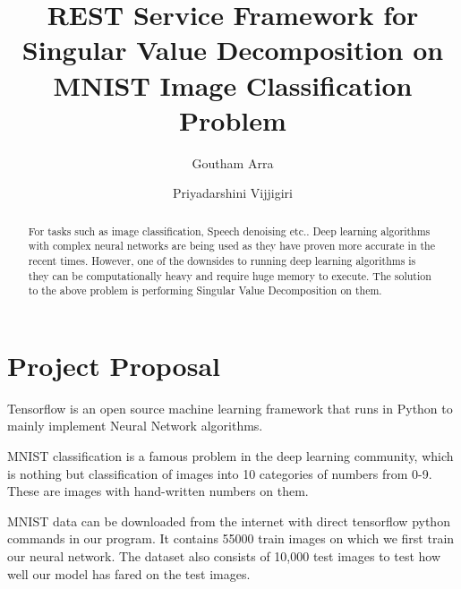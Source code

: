 
\title{REST Service Framework for Singular Value  Decomposition on MNIST Image Classification Problem}

\author{Goutham Arra}

\author{Priyadarshini Vijjigiri}

\renewcommand{\shortauthors}{G. v. Laszewski}


\begin{abstract} 
For tasks such as image classification, Speech denoising etc..
Deep learning algorithms with complex  neural networks are being used as they
have proven more accurate in the recent  times. However, one of the downsides to
running deep learning algorithms is they can be computationally heavy and
require huge memory to execute. The solution to  the above problem is performing
Singular Value Decomposition on them.


\end{abstract}



\maketitle

\section{Project Proposal}

Tensorflow is an open source machine learning framework that runs in Python to 
mainly implement Neural Network algorithms. 

MNIST classification is a famous problem in the deep learning community, which
is  nothing but classification of images into 10 categories of numbers from 0-9.
These are images with hand-written numbers on them.

MNIST data can be downloaded from the internet with direct tensorflow python
commands in our program. It contains 55000 train images on which we first train 
our neural network. The dataset also consists of 10,000 test images to test
how well our model has fared on the test images.

